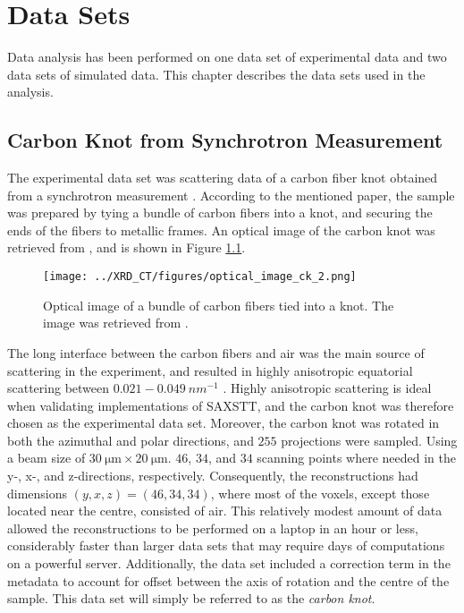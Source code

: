 \chapter{Data Sets} %
\label{ch:reconstruction_data_sets}

Data analysis has been performed on one data set of experimental data and two data sets of simulated data.
This chapter describes the data sets used in the analysis.

\section{Carbon Knot from Synchrotron Measurement} %
\label{sec:data_set_carbon_knot}
The experimental data set was scattering data of a carbon fiber knot obtained from a synchrotron measurement \cite{PMID_30821257}.
According to the mentioned paper, the sample was prepared by tying a bundle of carbon fibers into a knot, and securing the ends of the fibers to metallic frames.
An optical image of the carbon knot was retrieved from \cite{PMID_30821257}, and is shown in Figure \ref{fig:carbon_knot_image}.
\begin{figure}[htbp]
    \centering
    \texttt{[image: ../XRD\_CT/figures/optical\_image\_ck\_2.png]}
    \caption[Optical Image of Carbon Fiber Knot]{Optical image of a bundle of carbon fibers tied into a knot. The image was retrieved from \cite{PMID_30821257}.}
    \label{fig:carbon_knot_image}
\end{figure}
The long interface between the carbon fibers and air was the main source of scattering in the experiment, and resulted in highly anisotropic equatorial scattering between $\num{0.021}-\qty{0.049}{{nm}^{-1}}$ \cite{PMID_30821257}.
Highly anisotropic scattering is ideal when validating implementations of SAXSTT, and the carbon knot was therefore chosen as the experimental data set.
Moreover, the carbon knot was rotated in both the azimuthal and polar directions, and $\num{255}$ projections were sampled. Using a beam size of $\qty{30}{\micro \meter} \times \qty{20}{\micro \meter}$.
$\num{46}$, $\num{34}$, and $\num{34}$ scanning points where needed in the y-, x-, and z-directions, respectively.
Consequently, the reconstructions had dimensions $(y,x,z) = (\num{46},\num{34},\num{34})$, where most of the voxels, except those located near the centre, consisted of air.
This relatively modest amount of data allowed the reconstructions to be performed on a laptop in an hour or less, considerably faster than larger data sets that may require days of computations on a powerful server.   %
Additionally, the data set included a correction term in the metadata to account for offset between the axis of rotation
and the centre of the sample. This data set will simply be referred to as the \emph{carbon knot}.


